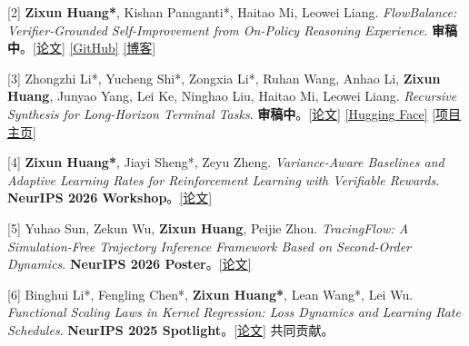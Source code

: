 \documentclass[a4paper,9pt]{extarticle}
\begin{document}
[2] \textbf{Zixun Huang*}, Kishan Panaganti*, Haitao Mi, Leowei Liang. \textit{FlowBalance: Verifier-Grounded Self-Improvement from On-Policy Reasoning Experience}. \textbf{审稿中}。\href{https://arxiv.org/abs/2609.03241}{[论文]} \href{https://github.com/alexhuang13/FlowBalance}{[GitHub]} \href{https://alexhuang13.github.io/FlowBalance-Blog/}{[博客]}

[3] Zhongzhi Li*, Yucheng Shi*, Zongxia Li*, Ruhan Wang, Anhao Li, \textbf{Zixun Huang}, Junyao Yang, Lei Ke, Ninghao Liu, Haitao Mi, Leowei Liang. \textit{Recursive Synthesis for Long-Horizon Terminal Tasks}. \textbf{审稿中}。\href{https://arxiv.org/abs/2608.05466}{[论文]} \href{https://huggingface.co/collections/Zhongzhi1228/recursive-synthesis-for-long-horizon-terminal-tasks}{[Hugging Face]} \href{https://zhongzhi660.github.io/recursive-verified-synthesis-site/?case=jobs-diff-01-3341b098}{[项目主页]}

[4] \textbf{Zixun Huang*}, Jiayi Sheng*, Zeyu Zheng. \textit{Variance-Aware Baselines and Adaptive Learning Rates for Reinforcement Learning with Verifiable Rewards}. \textbf{NeurIPS 2026 Workshop}。\href{https://arxiv.org/abs/2511.23310}{[论文]}

[5] Yuhao Sun, Zekun Wu, \textbf{Zixun Huang}, Peijie Zhou. \textit{TracingFlow: A Simulation-Free Trajectory Inference Framework Based on Second-Order Dynamics}. \textbf{NeurIPS 2026 Poster}。\href{https://arxiv.org/pdf/2608.21070}{[论文]}

[6] Binghui Li*, Fengling Chen*, \textbf{Zixun Huang*}, Lean Wang*, Lei Wu. \textit{Functional Scaling Laws in Kernel Regression: Loss Dynamics and Learning Rate Schedules}. \textcolor[HTML]{8B0000}{\textbf{NeurIPS 2025 Spotlight}}。\href{https://arxiv.org/abs/2509.19189}{[论文]} {\footnotesize * 共同贡献。}

\end{document}
